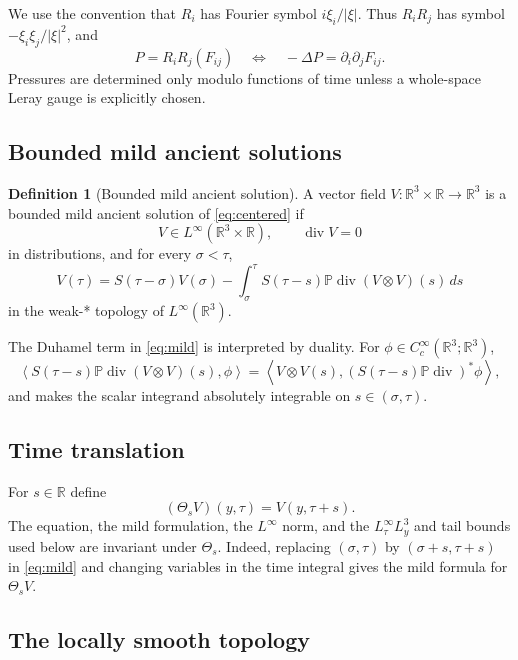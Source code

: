 \documentclass[11pt]{amsart}
\theoremstyle{plain}
\theoremstyle{definition}
\newtheorem{definition}[theorem]{Definition}
\theoremstyle{remark}
\numberwithin{equation}{section}
\newcommand{\R}{\mathbb R}
\newcommand{\divergence}{\operatorname{div}}
\begin{document}
We use the convention that \(R_i\) has Fourier symbol \(i\xi_i/|\xi|\).  Thus
\(R_iR_j\) has symbol \(-\xi_i\xi_j/|\xi|^2\), and
\[
   P=R_iR_j(F_{ij})
   \quad\Longleftrightarrow\quad
   -\Delta P=\partial_i\partial_jF_{ij}.
\]
Pressures are determined only modulo functions of time unless a whole-space
Leray gauge is explicitly chosen.

\subsection{Bounded mild ancient solutions}

\begin{definition}[Bounded mild ancient solution]\label{def:mild}
A vector field \(V:\R^3\times\R\to\R^3\) is a bounded mild ancient solution of
\eqref{eq:centered} if
\[
   V\in L^\infty(\R^3\times\R),\qquad \divergence V=0
\]
in distributions, and for every \(\sigma<\tau\),
\begin{equation}\label{eq:mild}
   V(\tau)
   =
   S(\tau-\sigma)V(\sigma)
   -
   \int_\sigma^\tau
   S(\tau-s)\mathbb P\divergence(V\otimes V)(s)\,ds
\end{equation}
in the weak-* topology of \(L^\infty(\R^3)\).
\end{definition}

The Duhamel term in \eqref{eq:mild} is interpreted by duality.  For
\(\phi\in C_c^\infty(\R^3;\R^3)\),
\[
   \left\langle
      S(\tau-s)\mathbb P\divergence(V\otimes V)(s),\phi
   \right\rangle
   =
   \left\langle
      V\otimes V(s),
      (S(\tau-s)\mathbb P\divergence)^*\phi
   \right\rangle ,
\]
and  makes the scalar integrand absolutely
integrable on \(s\in(\sigma,\tau)\).

\subsection{Time translation}

For \(s\in\R\) define
\[
   (\Theta_sV)(y,\tau)=V(y,\tau+s).
\]
The equation, the mild formulation, the \(L^\infty\) norm, and the
\(L^\infty_\tau L^3_y\) and tail bounds used below are invariant under
\(\Theta_s\).  Indeed, replacing \((\sigma,\tau)\) by
\((\sigma+s,\tau+s)\) in \eqref{eq:mild} and changing variables in the time
integral gives the mild formula for \(\Theta_sV\).

\subsection{The locally smooth topology}
\end{document}
